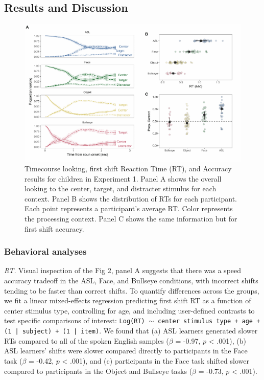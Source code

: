 \documentclass[english,floatsintext,man]{apa6}
\theoremstyle{definition}
\theoremstyle{definition}
\theoremstyle{definition}
\theoremstyle{remark}
\begin{document}
\hypertarget{results-and-discussion}{%
\subsection{Results and Discussion}\label{results-and-discussion}}

\begin{figure}[tb]

{\centering \includegraphics[width=0.9\linewidth]{figs/speed-acc-trio-plot-1} 

}

\caption{Timecourse looking, first shift Reaction Time (RT), and Accuracy results for children in Experiment 1. Panel A shows the overall looking to the center, target, and distracter stimulus for each context. Panel B shows the distribution of RTs for each participant. Each point represents a participant's average RT. Color represents the processing context. Panel C shows the same information but for first shift accuracy.}\label{fig:speed-acc-trio-plot}
\end{figure}

\hypertarget{behavioral-analyses}{%
\subsubsection{Behavioral analyses}\label{behavioral-analyses}}

\emph{RT.} Visual inspection of the Fig 2, panel A suggests that there
was a speed accuracy tradeoff in the ASL, Face, and Bullseye conditions,
with incorrect shifts tending to be faster than correct shifts. To
quantify differences across the groups, we fit a linear mixed-effects
regression predicting first shift RT as a function of center stimulus
type, controlling for age, and including user-defined contrasts to test
specific comparisons of interest:
\texttt{Log(RT) $\sim$ center stimulus type + age +  (1 | subject) + (1 | item)}.
We found that (a) ASL learners generated slower RTs compared to all of
the spoken English samples (\(\beta\) = -0.97, \(p\) \textless{} .001),
(b) ASL learners' shifts were slower compared directly to participants
in the Face task (\(\beta\) = -0.42, \(p\) \textless{} .001), and (c)
participants in the Face task shifted slower compared to participants in
the Object and Bullseye tasks (\(\beta\) = -0.73, \(p\) \textless{}
.001).
\end{document}
